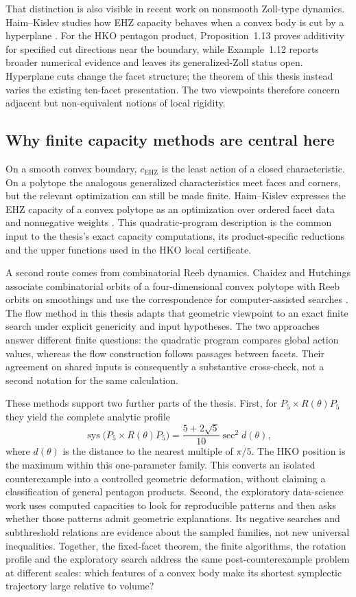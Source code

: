That distinction is also visible in recent work on nonsmooth Zoll-type
dynamics.  Haim--Kislev studies how EHZ capacity behaves when a convex body
is cut by a hyperplane \cite{HaimKislev2025Zoll}.  For the HKO pentagon
product, Proposition~1.13 proves additivity for specified cut directions
near the boundary, while Example~1.12 reports broader numerical evidence
and leaves its generalized-Zoll status open.  Hyperplane cuts change the
facet structure; the theorem of this thesis instead varies the existing
ten-facet presentation.  The two viewpoints therefore concern adjacent but
non-equivalent notions of local rigidity.

\subsection{Why finite capacity methods are central here}

On a smooth convex boundary, \(c_{\mathrm{EHZ}}\) is the least action of a
closed characteristic.  On a polytope the analogous generalized
characteristics meet faces and corners, but the relevant optimization can
still be made finite.  Haim--Kislev expresses the EHZ capacity of a convex
polytope as an optimization over ordered facet data and nonnegative weights
\cite[Theorem~1.1]{HaimKislev2019}.  This quadratic-program description is
the common input to the thesis's exact capacity computations, its
product-specific reductions and the upper functions used in the HKO local
certificate.

A second route comes from combinatorial Reeb dynamics.  Chaidez and
Hutchings associate combinatorial orbits of a four-dimensional convex
polytope with Reeb orbits on smoothings and use the correspondence for
computer-assisted searches \cite{ChaidezHutchings2021}.  The flow method in
this thesis adapts that geometric viewpoint to an exact finite search under
explicit genericity and input hypotheses.  The two approaches answer
different finite questions: the quadratic program compares global action
values, whereas the flow construction follows passages between facets.  Their
agreement on shared inputs is consequently a substantive cross-check, not a
second notation for the same calculation.

These methods support two further parts of the thesis.  First, for
\(P_5\times R(\theta)P_5\) they yield the complete analytic profile
\[
  \operatorname{sys}\bigl(P_5\times R(\theta)P_5\bigr)
  =\frac{5+2\sqrt5}{10}\sec^2 d(\theta),
\]
where \(d(\theta)\) is the distance to the nearest multiple of
\(\pi/5\).  The HKO position is the maximum within this one-parameter
family.  This converts an isolated counterexample into a controlled
geometric deformation, without claiming a classification of general
pentagon products.  Second, the exploratory data-science work uses computed
capacities to look for reproducible patterns and then asks whether those
patterns admit geometric explanations.  Its negative searches and
subthreshold relations are evidence about the sampled families, not new
universal inequalities.  Together, the fixed-facet theorem, the finite
algorithms, the rotation profile and the exploratory search address the same
post-counterexample problem at different scales: which features of a convex
body make its shortest symplectic trajectory large relative to volume?
